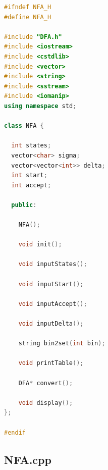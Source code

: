 \documentclass{article}
\begin{document}
\begin{lstlisting}[language=C++]
#ifndef NFA_H
#define NFA_H

#include "DFA.h"
#include <iostream>
#include <cstdlib>
#include <vector>
#include <string>
#include <sstream>
#include <iomanip>
using namespace std;

class NFA {

  int states;
  vector<char> sigma;
  vector<vector<int>> delta;
  int start;
  int accept;

  public:

    NFA();

    void init();

    void inputStates();

    void inputStart();

    void inputAccept();

    void inputDelta();

    string bin2set(int bin);

    void printTable();

    DFA* convert();
    
    void display();
};

#endif
\end{lstlisting}

\newpage

\subsection*{NFA.cpp}
\end{document}
